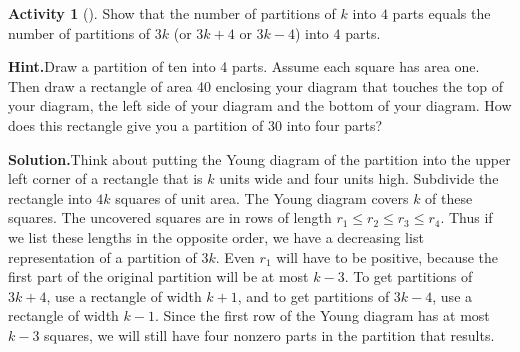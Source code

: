 \documentclass[10pt,]{book}
\theoremstyle{plain}
\theoremstyle{definition}
\newtheorem{activity}[project]{Activity}
\numberwithin{equation}{chapter}
\begin{document}
\begin{activity}[]\label{rectanglecomplement}
Show that the number of partitions of \(k\) into \(4\) parts equals the number of partitions of \(3k\) (or \(3k+4\) or \(3k-4\)) into \(4\) parts.%
\par\medskip\noindent%
\textbf{Hint.}\quad Draw a partition of ten into 4 parts. Assume each square has area one. Then draw a rectangle of area 40 enclosing your diagram that touches the top of your diagram, the left side of your diagram and the bottom of your diagram. How does this rectangle give you a partition of 30 into four parts?%
\par\medskip\noindent%
\textbf{Solution.}\quad Think about putting the Young diagram of the partition into the upper left corner of a rectangle that is \(k\) units wide and four units high. Subdivide the rectangle into \(4k\) squares of unit area. The Young diagram covers \(k\) of these squares. The uncovered squares are in rows of length \(r_1\le r_2\le r_3\le r_4\). Thus if we list these lengths in the opposite order, we have a decreasing list representation of a partition of \(3k\). Even \(r_1\) will have to be positive, because the first part of the original partition will be at most \(k-3\). To get partitions of \(3k+4\), use a rectangle of width \(k+1\), and to get partitions of \(3k-4\), use a rectangle of width \(k-1\). Since the first row of the Young diagram has at most \(k-3\) squares, we will still have four nonzero parts in the partition that results.%
\end{activity}
\end{document}
